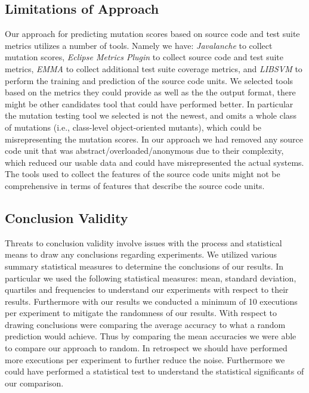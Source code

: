 \subsection{Limitations of Approach}
\label{subset:conclusions_limitations_approach}
Our approach for predicting mutation scores based on source code and test suite metrics utilizes a number of tools. Namely we have: \emph{Javalanche} to collect mutation scores, \emph{Eclipse Metrics Plugin} to collect source code and test suite metrics, \emph{EMMA} to collect additional test suite coverage metrics, and \emph{LIBSVM} to perform the training and prediction of the source code units. We selected tools based on the metrics they could provide as well as the the output format, there might be other candidates tool that could have performed better. In particular the mutation testing tool we selected is not the newest, and omits a whole class of mutations (i.e., class-level object-oriented mutants), which could be misrepresenting the mutation scores. In our approach we had removed any source code unit that was abstract/overloaded/anonymous due to their complexity, which reduced our usable data and could have misrepresented the actual systems. The tools used to collect the features of the source code units might not be comprehensive in terms of features that describe the source code units. 


\subsection{Conclusion Validity}
\label{subsec:conclusions_conclusion_validity}
Threats to conclusion validity involve issues with the process and statistical means to draw any conclusions regarding experiments. We utilized various summary statistical measures to determine the conclusions of our results. In particular we used the following statistical measures: mean, standard deviation, quartiles and frequencies to understand our experiments with respect to their results. Furthermore with our results we conducted a minimum of 10 executions per experiment to mitigate the randomness of our results. With respect to drawing conclusions were comparing the average accuracy to what a random prediction would achieve. Thus by comparing the mean accuracies we were able to compare our approach to random. In retrospect we should have performed more executions per experiment to further reduce the noise. Furthermore we could have performed a statistical test to understand the statistical significants of our comparison.



